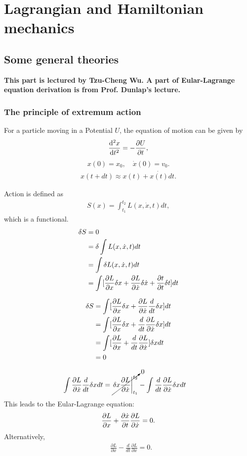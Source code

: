 \chapter{Lagrangian and Hamiltonian mechanics}\label{chap:lagham}
\section{Some general theories}
\textbf{This part is lectured by Tzu-Cheng Wu. A part of Eular-Lagrange equation derivation is from Prof. Dunlap's lecture.}

\subsection{The principle of extremum action}\label{sec:action}
For a particle moving in  a Potential $ U $, the equation of motion can be given by
\begin{align}
\frac{{\mathrm d}^2 {x}}{{\mathrm d}t^2}=-\frac{\partial {U}}{\partial t},
\end{align}
\begin{align}
x(0)=x_0,\quad \dot{x}(0)=v_0.
\end{align}
\begin{align}
x(t+dt)\approx x(t)+\dot{x(t)}dt.
\end{align}


Action is defined as
\begin{align}
S(x)= \int_{t_1}^{t_2} L(x,\dot{x},t)dt,
\end{align}
which is a functional. 
\begin{align}
\delta{S}&=0\\
&= \delta\int L(x,\dot{x},t)dt\\
&= \int \delta L(x,\dot{x},t)dt\\
&= \int [\frac{\partial {L}}{\partial x}\delta x + \frac{\partial {L}}{\partial {\dot{x}}}\delta \dot{x}+ \frac{\partial {t}}{\partial {t}}\delta t ]dt
\end{align}

\begin{align}
\delta S &= \int [\frac{\partial {L}}{\partial x}\delta x + \frac{\partial {L}}{\partial {\dot{x}}}\frac{d}{dt}\delta x ]dt\\
&= \int  [\frac{\partial {L}}{\partial x}\delta x + \frac{d}{dt}\frac{\partial {L}}{\partial {\dot{x}}}\delta x ]dt\\
&=  \int  [\frac{\partial {L}}{\partial x} + \frac{d}{dt}\frac{\partial {L}}{\partial {\dot{x}}}]\delta x dt\\
&=0
\end{align}

\begin{align}
\int \frac{\partial {L}}{\partial {\dot{x}}} \frac{d}{dt} \delta x dt &= \cancelto{0}{\left.\delta x \frac{\partial {L}}{\partial {\dot{x}}}\right|^{t_2}_{t_1}} - \int \frac{d}{dt} \frac{\partial {L}}{\partial {\dot{x}}} \delta x dt
\end{align}
This leads to the Eular-Lagrange equation:
\begin{align}
\frac{\partial {L}}{\partial {x}} + \frac{\partial {\dot{x}}}{\partial {t}}\frac{\partial {L}}{\partial {\dot{x}}}=0.
\end{align}
Alternatively,
\begin{align}
 & \boxed{\frac{\partial L}{\partial x}-\frac{d}{dt}\frac{\partial L}{\partial x}=0}.
\end{align}



